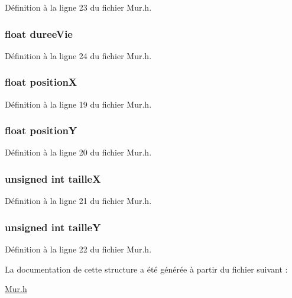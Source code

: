 Définition à la ligne 23 du fichier Mur.\-h.

\hypertarget{struct_mur_a70238edfbee0de43d594921f108c7ad3}{
\subsubsection[{duree\-Vie}]{\setlength{\rightskip}{0pt plus 5cm}float duree\-Vie}}\label{struct_mur_a70238edfbee0de43d594921f108c7ad3}


Définition à la ligne 24 du fichier Mur.\-h.

\hypertarget{struct_mur_a79a982036e5591bf27af7cc2edcd6f4c}{
\subsubsection[{position\-X}]{\setlength{\rightskip}{0pt plus 5cm}float position\-X}}\label{struct_mur_a79a982036e5591bf27af7cc2edcd6f4c}


Définition à la ligne 19 du fichier Mur.\-h.

\hypertarget{struct_mur_ad17be35b83017d6dc83074e6b8d21207}{
\subsubsection[{position\-Y}]{\setlength{\rightskip}{0pt plus 5cm}float position\-Y}}\label{struct_mur_ad17be35b83017d6dc83074e6b8d21207}


Définition à la ligne 20 du fichier Mur.\-h.

\hypertarget{struct_mur_a14a7f2008ff990cae95babeb28176bad}{
\subsubsection[{taille\-X}]{\setlength{\rightskip}{0pt plus 5cm}unsigned int taille\-X}}\label{struct_mur_a14a7f2008ff990cae95babeb28176bad}


Définition à la ligne 21 du fichier Mur.\-h.

\hypertarget{struct_mur_ab277c464cec35f230262c48fec89a566}{
\subsubsection[{taille\-Y}]{\setlength{\rightskip}{0pt plus 5cm}unsigned int taille\-Y}}\label{struct_mur_ab277c464cec35f230262c48fec89a566}


Définition à la ligne 22 du fichier Mur.\-h.



La documentation de cette structure a été générée à partir du fichier suivant \-:\begin{DoxyCompactItemize}
\item 
\hyperlink{_mur_8h}{Mur.\-h}\end{DoxyCompactItemize}

